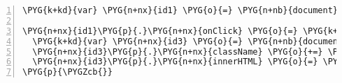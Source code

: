 \begin{Verbatim}[commandchars=\\\{\},numbers=left,stepnumber=1,codes={\catcode`\$=3\catcode`\^=7\catcode`\_=8}]
\PYG{k+kd}{var} \PYG{n+nx}{id1} \PYG{o}{=} \PYG{n+nb}{document}\PYG{p}{.}\PYG{n+nx}{getElementById}\PYG{p}{(}\PYG{l+s+s1}{'id1'}\PYG{p}{)}\PYG{p}{;}

\PYG{n+nx}{id1}\PYG{p}{.}\PYG{n+nx}{onClick} \PYG{o}{=} \PYG{k+kd}{function}\PYG{p}{(}\PYG{n+nx}{evt}\PYG{p}{)}\PYG{p}{\PYGZob{}}
  \PYG{k+kd}{var} \PYG{n+nx}{id3} \PYG{o}{=} \PYG{n+nb}{document}\PYG{p}{.}\PYG{n+nx}{getElementsByTagName}\PYG{p}{(}\PYG{l+s+s1}{'div'}\PYG{p}{)}\PYG{p}{[}\PYG{l+m+mi}{0}\PYG{p}{]}\PYG{p}{;}
  \PYG{n+nx}{id3}\PYG{p}{.}\PYG{n+nx}{className} \PYG{o}{+=} \PYG{l+s+s1}{' class2'}\PYG{p}{;}
  \PYG{n+nx}{id3}\PYG{p}{.}\PYG{n+nx}{innerHTML} \PYG{o}{=} \PYG{l+s+s1}{'Don\PYGZbs{}'t leave yet!'}\PYG{p}{;}
\PYG{p}{\PYGZcb{}}
\end{Verbatim}
